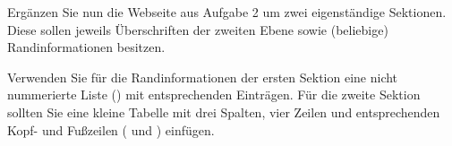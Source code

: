 %
\par Ergänzen Sie nun die Webseite aus Aufgabe 2 um zwei eigenständige
Sektionen. Diese sollen jeweils Überschriften der zweiten Ebene sowie
(beliebige) Randinformationen besitzen.
%
\par Verwenden Sie für die Randinformationen der ersten Sektion eine nicht
nummerierte Liste () mit entsprechenden Einträgen. Für die zweite
Sektion sollten Sie eine kleine Tabelle mit drei Spalten, vier Zeilen und
entsprechenden Kopf- und Fußzeilen ( und ) einfügen.